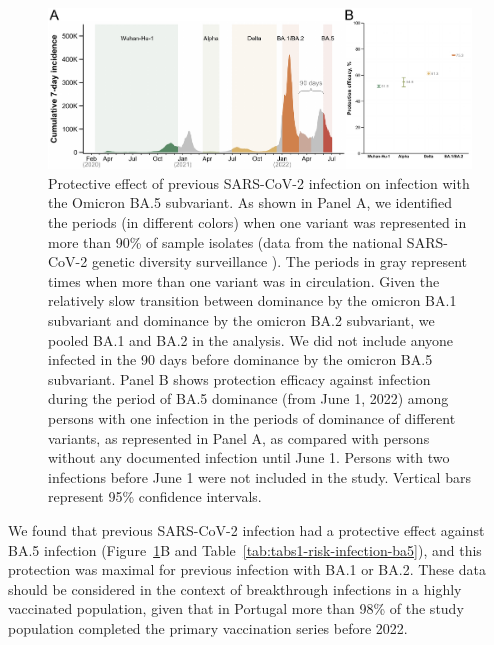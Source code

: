 \begin{figure}[h]
    \centering
    \includegraphics[width=\textwidth]{chapter/2022-covid19-01/figures/fig1-protective-effect-to-omicron}
    \caption[Protective effect of previous SARS-CoV-2 infection on infection with the Omicron BA.5 subvariant]{Protective effect of previous SARS-CoV-2 infection on infection with the Omicron BA.5 subvariant. As shown in Panel A, we identified the periods (in different colors) when one variant was represented in more than 90\% of sample isolates (data from the national SARS-CoV-2 genetic diversity surveillance \citep{institutonacionaldesaudedoutorricardojorge2022GeneticDiversity}). The periods in gray represent times when more than one variant was in circulation. Given the relatively slow transition between dominance by the omicron BA.1 subvariant and dominance by the omicron BA.2 subvariant, we pooled BA.1 and BA.2 in the analysis. We did not include anyone infected in the 90 days before dominance by the omicron BA.5 subvariant. Panel B shows protection efficacy against infection during the period of BA.5 dominance (from June 1, 2022) among persons with one infection in the periods of dominance of different variants, as represented in Panel A, as compared with persons without any documented infection until June 1. Persons with two infections before June 1 were not included in the study. Vertical bars represent 95\% confidence intervals.}
    \label{fig:protective-effect-to-omicron}
\end{figure}

We found that previous SARS-CoV-2 infection had a protective effect against BA.5 infection (Figure~\ref{fig:protective-effect-to-omicron}B and Table~\ref{tab:tabs1-risk-infection-ba5}), and this protection was maximal for previous infection with BA.1 or BA.2. These data should be considered in the context of breakthrough infections in a highly vaccinated population, given that in Portugal more than 98\% of the study population completed the primary vaccination series before 2022.

